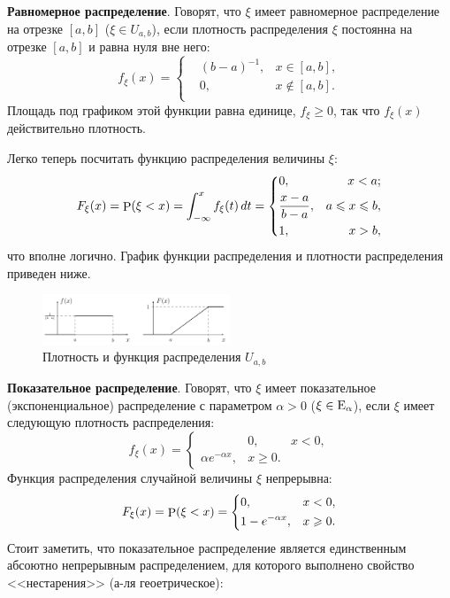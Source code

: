 \textbf{Равномерное распределение}. Говорят, что $\xi$ имеет равномерное распределение на отрезке $[a, b]$ ($\xi \in U_{a,b}$), если плотность распределения $\xi$ постоянна на отрезке $[a, b]$ и равна нуля вне него:
\begin{equation*}
    f_\xi (x) = \left\{\begin{aligned}
        &(b-a)^{-1}, &x\in[a, b], \\
        &0, &x\notin[a, b]. \\
    \end{aligned}\right.
\end{equation*}
Площадь под графиком этой функции равна единице, $f_\xi \geq 0$, так что $f_\xi (x)$ действительно плотность.

Легко теперь посчитать функцию распределения величины $\xi$:
\begin{equation*}
    F_\xi (x) = \P (\xi < x) = \int_{-\infty}^{x} f_\xi (t) \d t = \left\{\begin{aligned}
        &0, & x < a; \\
        & \frac{x-a}{b-a}, & a \leq x \leq b, \\
        &1, &x > b,
    \end{aligned}\right.
\end{equation*}
что вполне логично. График функции распределения и плотности распределения приведен ниже.

\begin{figure}[ht]
    \centering
    \includegraphics[width=0.5\textwidth]{img/d1.png}
    \caption{ Плотность и функция распределения $U_{a, b}$}
\end{figure}


\textbf{Показательное распределение}.
Говорят, что $\xi$ имеет показательное (экспоненциальное) распределение с параметром $\alpha > 0$ ($\xi \in \textnormal{E}_\alpha$), если $\xi$ имеет следующую плотность распределения:
\begin{equation*}
    f_\xi (x) = \left\{\begin{aligned}
        &0, &x < 0, \\
        \alpha e^{- \alpha x}, & x \geq 0.        
    \end{aligned}\right.
\end{equation*}
Функция распределения случайной величины $\xi$ непрерывна:
\begin{equation*}
    F_\xi (x) = \P (\xi < x) = \left\{\begin{aligned}
        &0, & x < 0, \\
        &1-e^{-\alpha x}, & x \geq 0.
    \end{aligned}\right.
\end{equation*}
Стоит заметить, что показательное распределение является единственным абсоютно непрерывным распределением, для которого выполнено свойство <<нестарения>> (а-ля геоетрическое):

